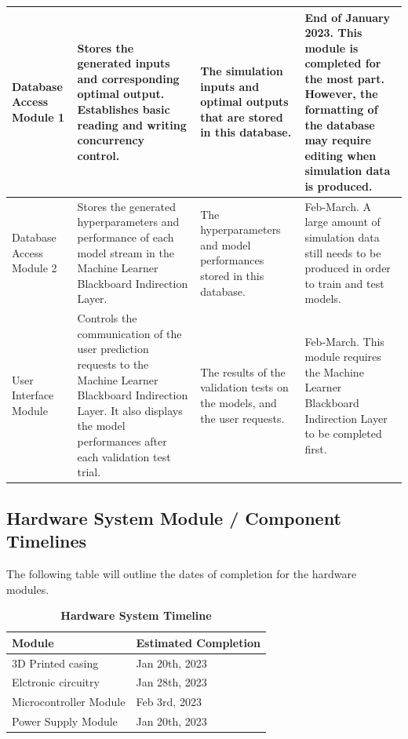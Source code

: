 \documentclass[12pt, titlepage]{article}
\begin{document}
\begin{longtable}{|p{2cm}|p{3cm}|p{3cm}|p{3cm}}
    \hline 
    Database Access Module 1 & Stores the generated inputs and corresponding optimal output. Establishes basic reading and writing concurrency control. & The simulation inputs and optimal outputs that are stored in this database. & End of January 2023. This module is completed for the most part. However, the formatting of the database may require editing when simulation data is produced.\\
    \hline 
    Database Access Module 2 & Stores the generated hyperparameters and performance of each model stream in the Machine Learner Blackboard Indirection Layer. & The hyperparameters and model performances stored in this database. & Feb-March. A large amount of simulation data still needs to be produced in order to train and test models.\\
    \hline 
    User Interface Module & Controls the communication of the user prediction requests to the Machine Learner Blackboard Indirection Layer. It also displays the model performances after each validation test trial. & The results of the validation tests on the models, and the user requests. & Feb-March. This module requires the Machine Learner Blackboard Indirection Layer to be completed first. \\
    \hline 
\end{longtable}
\subsection{Hardware System Module / Component Timelines}
The following table will outline the dates of completion for the hardware modules.
\begin{table}[htp]
  \caption{\bf Hardware System Timeline}
      \begin{tabular}{|p{4cm}|p{4cm}|}
           \hline
           \bf Module & \bf Estimated Completion\\
           \hline
           3D Printed casing & Jan 20th, 2023\\
           \hline
           Elctronic circuitry & Jan 28th, 2023\\
           \hline
           Microcontroller Module & Feb 3rd, 2023\\
           \hline 
           Power Supply Module & Jan 20th, 2023\\
           \hline 
      \end{tabular}
  \end{table}
\end{document}
